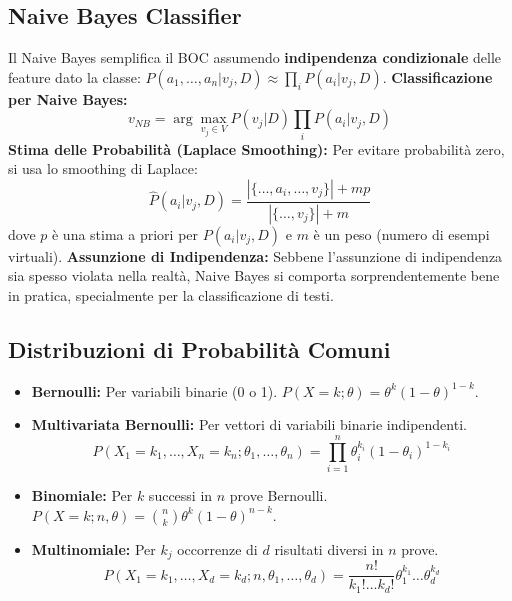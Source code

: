\documentclass[a4paper,11pt]{article}
\begin{document}
\subsection{Naive Bayes Classifier}
Il Naive Bayes semplifica il BOC assumendo \textbf{indipendenza condizionale} delle feature dato la classe: $P(a_1, \dots, a_n | v_j, D) \approx \prod_i P(a_i | v_j, D)$.
\noindent\textbf{Classificazione per Naive Bayes:}
\begin{equation}
    v_{NB} = \arg\max_{v_j \in V} P(v_j | D) \prod_i P(a_i | v_j, D)
\end{equation}
\textbf{Stima delle Probabilità (Laplace Smoothing):} Per evitare probabilità zero, si usa lo smoothing di Laplace:
\begin{equation}
    \hat{P}(a_i | v_j, D) = \frac{|\{ \ldots, a_i, \ldots, v_j \}| + m p}{|\{ \ldots, v_j \}| + m}
\end{equation}
dove $p$ è una stima a priori per $P(a_i | v_j, D)$ e $m$ è un peso (numero di esempi virtuali).
\textbf{Assunzione di Indipendenza:} Sebbene l'assunzione di indipendenza sia spesso violata nella realtà, Naive Bayes si comporta sorprendentemente bene in pratica, specialmente per la classificazione di testi.

\subsection{Distribuzioni di Probabilità Comuni}
\begin{itemize}
    \item \textbf{Bernoulli:} Per variabili binarie (0 o 1). $P(X=k; \theta) = \theta^k (1-\theta)^{1-k}$.
    \item \textbf{Multivariata Bernoulli:} Per vettori di variabili binarie indipendenti.
    \begin{equation}
        P(X_1=k_1, \dots, X_n=k_n; \theta_1, \dots, \theta_n) = \prod_{i=1}^n \theta_i^{k_i} (1-\theta_i)^{1-k_i}
    \end{equation}
    \item \textbf{Binomiale:} Per $k$ successi in $n$ prove Bernoulli. $P(X=k; n, \theta) = \binom{n}{k} \theta^k (1-\theta)^{n-k}$.
    \item \textbf{Multinomiale:} Per $k_j$ occorrenze di $d$ risultati diversi in $n$ prove.
    \begin{equation}
        P(X_1=k_1, \dots, X_d=k_d; n, \theta_1, \dots, \theta_d) = \frac{n!}{k_1! \dots k_d!} \theta_1^{k_1} \dots \theta_d^{k_d}
    \end{equation}
\end{itemize}
\end{document}
